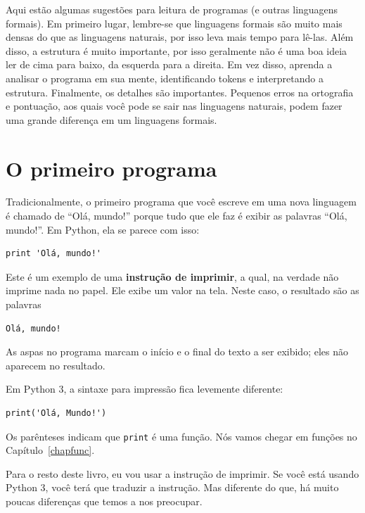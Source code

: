 \documentclass[10pt]{book}
\begin{document}
Aqui estão algumas sugestões para leitura de programas (e outras linguagens
formais). Em primeiro lugar, lembre-se que linguagens formais são muito mais densas
do que as linguagens naturais, por isso leva mais tempo para lê-las. Além disso, a
estrutura é muito importante, por isso geralmente não é uma boa ideia ler
de cima para baixo, da esquerda para a direita. Em vez disso, aprenda a analisar o
programa em sua mente, identificando tokens e interpretando a
estrutura. Finalmente, os detalhes são importantes. Pequenos erros na
ortografia e pontuação, aos quais você pode se sair
nas linguagens naturais, podem fazer uma grande diferença em um linguagens
formais.


\section{O primeiro programa}
\label{olá}

Tradicionalmente, o primeiro programa que você escreve em uma nova linguagem
é chamado de ``Olá, mundo!'' porque tudo que ele faz é exibir as
palavras ``Olá, mundo!''. Em Python, ela se parece com isso:

\begin{verbatim}
print 'Olá, mundo!'
\end{verbatim}
%
Este é um exemplo de uma {\bf instrução de imprimir}, a qual,
na verdade não imprime nada no papel. Ele exibe um valor na
tela. Neste caso, o resultado são as palavras

\begin{verbatim}
Olá, mundo!
\end{verbatim}
%
As aspas no programa marcam o início e o final
do texto a ser exibido; eles não aparecem no resultado.

Em Python 3, a sintaxe para impressão fica levemente diferente:

\begin{verbatim}
print('Olá, Mundo!')
\end{verbatim}
%
Os parênteses indicam que {\tt print} é uma função. Nós vamos chegar
em funções no Capítulo~\ref{chapfunc}.
  

Para o resto deste livro, eu vou usar a instrução de imprimir. Se você
está usando Python 3, você terá que traduzir a instrução. Mas diferente do
que, há muito poucas diferenças que temos a nos preocupar. %
\end{document}
